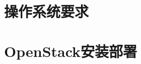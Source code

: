\documentclass[a4paper,12pt,oneside]{report}
\begin{document}


\part{操作系统要求}






\part{OpenStack安装部署}

\end{document}
